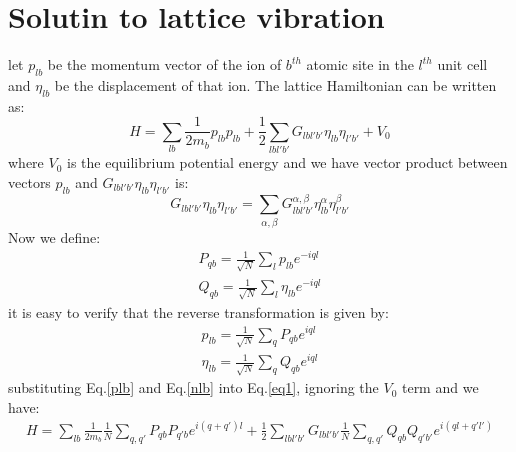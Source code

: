 \documentclass{article}
\begin{document}
\section{Solutin to lattice vibration}
let $p_{lb}$ be the momentum vector of the ion of $b^{th}$ atomic site in the $l^{th}$ unit cell 
and $\eta_{lb}$ be the displacement of that ion. The lattice Hamiltonian can be written as:
\begin{equation}
    H = \sum_{lb} \frac{1}{2m_b} p_{lb} p_{lb} + \frac{1}{2} \sum_{lbl'b'} G_{lbl'b'} \eta_{lb} \eta_{l'b'} + V_0 \label{eq1}
\end{equation}
where $V_0$ is the equilibrium potential energy and 
we have vector product between vectors $p_{lb}$ and $G_{lbl'b'} \eta_{lb} \eta_{l'b'}$ is:
\begin{equation}
    G_{lbl'b'} \eta_{lb} \eta_{l'b'} = \sum_{\alpha,\beta} G_{lbl'b'}^{\alpha,\beta} \eta_{lb}^{\alpha} \eta_{l'b'} ^{\beta}
\end{equation}
Now we define:
\begin{gather}
    P_{qb} = \frac{1}{\sqrt{N}} \sum_{l} p_{lb} e^{-iql} \\
    Q_{qb} = \frac{1}{\sqrt{N}} \sum_{l} \eta_{lb} e^{-iql}
\end{gather}
it is easy to verify that the reverse transformation is given by:
\begin{gather}
    p_{lb} = \frac{1}{\sqrt{N}} \sum_{q} P_{qb} e^{iql} \label{plb} \\
    \eta_{lb} = \frac{1}{\sqrt{N}} \sum_{q} Q_{qb} e^{iql} \label{nlb}
\end{gather}
substituting Eq.\ref{plb} and Eq.\ref{nlb} into Eq.\ref{eq1}, ignoring the $V_0$ term and we have:
\begin{align}
    H = \sum_{lb} \frac{1}{2m_b} \frac{1}{N} \sum_{q,q'} P_{qb} P_{q'b} e^{i(q+q')l} 
       + \frac{1}{2} \sum_{lbl'b'} G_{lbl'b'} \frac{1}{N} \sum_{q,q'} Q_{qb} Q_{q'b'} e^{i(ql+q'l')}
\end{align}
\end{document}
